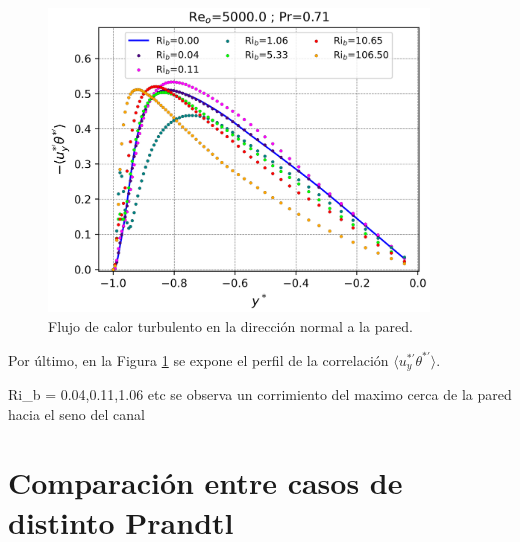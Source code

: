 \begin{figure}[H] %
  \centering
  \includegraphics[width=0.9\textwidth]{figures/cap5/Re5000-Pr071/uyphif_profile.png}  
  \caption{Flujo de calor turbulento en la dirección normal a la pared.}
  \label{fig:uyphi_f-Re5000-Pr071}
\end{figure}

Por último, en la Figura \ref{fig:uyphi_f-Re5000-Pr071} se expone el perfil de la correlación $\langle u_y^{\ast \prime } \theta^{\ast \prime } \rangle$. 

Ri_b = 0.04,0.11,1.06 etc se observa un corrimiento del maximo cerca de la pared hacia el seno del canal


\section{Comparación entre casos de distinto Prandtl}


